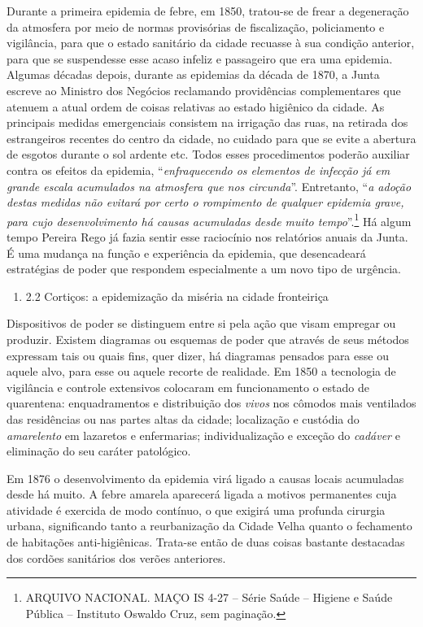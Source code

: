 Durante a primeira epidemia de febre, em 1850, tratou-se de frear a
degeneração da atmosfera por meio de normas provisórias de fiscalização,
policiamento e vigilância, para que o estado sanitário da cidade
recuasse à sua condição anterior, para que se suspendesse esse acaso
infeliz e passageiro que era uma epidemia. Algumas décadas depois,
durante as epidemias da década de 1870, a Junta escreve ao Ministro dos
Negócios reclamando providências complementares que atenuem a atual
ordem de coisas relativas ao estado higiênico da cidade. As principais
medidas emergenciais consistem na irrigação das ruas, na retirada dos
estrangeiros recentes do centro da cidade, no cuidado para que se evite
a abertura de esgotos durante o sol ardente etc. Todos esses
procedimentos poderão auxiliar contra os efeitos da epidemia,
``\emph{enfraquecendo os elementos de infecção já em grande escala
acumulados na atmosfera que nos circunda}''. Entretanto, ``\emph{a
adoção destas medidas não evitará por certo o rompimento de qualquer
epidemia grave, para cujo desenvolvimento há causas acumuladas desde
muito tempo}''.\footnote{ARQUIVO NACIONAL. MAÇO IS 4-27 -- Série Saúde
  -- Higiene e Saúde Pública -- Instituto Oswaldo Cruz, sem paginação.}
Há algum tempo Pereira Rego já fazia sentir esse raciocínio nos
relatórios anuais da Junta. É uma mudança na função e experiência da
epidemia, que desencadeará estratégias de poder que respondem
especialmente a um novo tipo de urgência.

\begin{enumerate}
\def\labelenumi{\arabic{enumi}.}
\setcounter{enumi}{3}
\tightlist
\item
  2.2 Cortiços: a epidemização da miséria na cidade fronteiriça
\end{enumerate}

Dispositivos de poder se distinguem entre si pela ação que visam
empregar ou produzir. Existem diagramas ou esquemas de poder que através
de seus métodos expressam tais ou quais fins, quer dizer, há diagramas
pensados para esse ou aquele alvo, para esse ou aquele recorte de
realidade. Em 1850 a tecnologia de vigilância e controle extensivos
colocaram em funcionamento o estado de quarentena: enquadramentos e
distribuição dos \emph{vivos} nos cômodos mais ventilados das
residências ou nas partes altas da cidade; localização e custódia do
\emph{amarelento} em lazaretos e enfermarias; individualização e exceção
do \emph{cadáver} e eliminação do seu caráter patológico.

Em 1876 o desenvolvimento da epidemia virá ligado a causas locais
acumuladas desde há muito. A febre amarela aparecerá ligada a motivos
permanentes cuja atividade é exercida de modo contínuo, o que exigirá
uma profunda cirurgia urbana, significando tanto a reurbanização da
Cidade Velha quanto o fechamento de habitações anti-higiênicas. Trata-se
então de duas coisas bastante destacadas dos cordões sanitários dos
verões anteriores.

